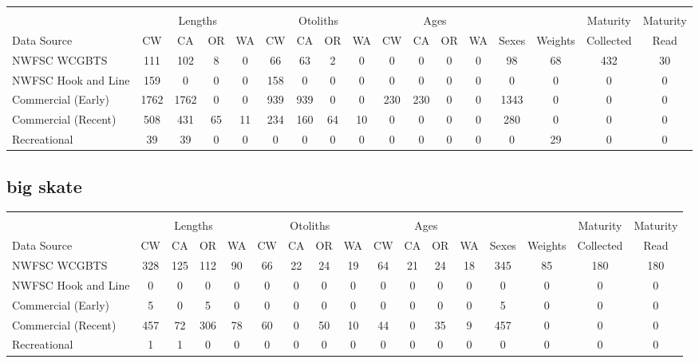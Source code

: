 \documentclass[12pt,]{article}
\begin{document}
\begin{table}[ht]
\centering
\begingroup\fontsize{10pt}{10pt}\selectfont
\begin{tabular}{|l|cccc|cccc|cccc|c|c|c|c|}
  \hline
 &  &  &  &  &  &  &  &  &  &  &  &  &  &  &  &  \\ 
   & \multicolumn{4}{c}{Lengths} &  \multicolumn{4}{c}{Otoliths} & \multicolumn{4}{c}{Ages} &  & & Maturity & Maturity\\
 Data Source & CW & CA & OR & WA & CW & CA & OR & WA & CW & CA & OR & WA & Sexes & Weights & Collected & Read\\
 \hline
NWFSC WCGBTS & 111 & 102 & 8 & 0 & 66 & 63 & 2 & 0 & 0 & 0 & 0 & 0 & 98 & 68 & 432 & 30 \\ 
  NWFSC Hook and Line & 159 & 0 & 0 & 0 & 158 & 0 & 0 & 0 & 0 & 0 & 0 & 0 & 0 & 0 & 0 & 0 \\ 
  Commercial (Early) & 1762 & 1762 & 0 & 0 & 939 & 939 & 0 & 0 & 230 & 230 & 0 & 0 & 1343 & 0 & 0 & 0 \\ 
  Commercial (Recent) & 508 & 431 & 65 & 11 & 234 & 160 & 64 & 10 & 0 & 0 & 0 & 0 & 280 & 0 & 0 & 0 \\ 
  Recreational & 39 & 39 & 0 & 0 & 0 & 0 & 0 & 0 & 0 & 0 & 0 & 0 & 0 & 29 & 0 & 0 \\ 
   \hline
\end{tabular}
\endgroup
\end{table}

\FloatBarrier  

\newpage  

\subsection{big skate}\label{big-skate}

\begin{table}[ht]
\centering
\begingroup\fontsize{10pt}{10pt}\selectfont
\begin{tabular}{|l|cccc|cccc|cccc|c|c|c|c|}
  \hline
 &  &  &  &  &  &  &  &  &  &  &  &  &  &  &  &  \\ 
   & \multicolumn{4}{c}{Lengths} &  \multicolumn{4}{c}{Otoliths} & \multicolumn{4}{c}{Ages} &  & & Maturity & Maturity\\
 Data Source & CW & CA & OR & WA & CW & CA & OR & WA & CW & CA & OR & WA & Sexes & Weights & Collected & Read\\
 \hline
NWFSC WCGBTS & 328 & 125 & 112 & 90 & 66 & 22 & 24 & 19 & 64 & 21 & 24 & 18 & 345 & 85 & 180 & 180 \\ 
  NWFSC Hook and Line & 0 & 0 & 0 & 0 & 0 & 0 & 0 & 0 & 0 & 0 & 0 & 0 & 0 & 0 & 0 & 0 \\ 
  Commercial (Early) & 5 & 0 & 5 & 0 & 0 & 0 & 0 & 0 & 0 & 0 & 0 & 0 & 5 & 0 & 0 & 0 \\ 
  Commercial (Recent) & 457 & 72 & 306 & 78 & 60 & 0 & 50 & 10 & 44 & 0 & 35 & 9 & 457 & 0 & 0 & 0 \\ 
  Recreational & 1 & 1 & 0 & 0 & 0 & 0 & 0 & 0 & 0 & 0 & 0 & 0 & 0 & 0 & 0 & 0 \\ 
   \hline
\end{tabular}
\endgroup
\end{table}
\end{document}

